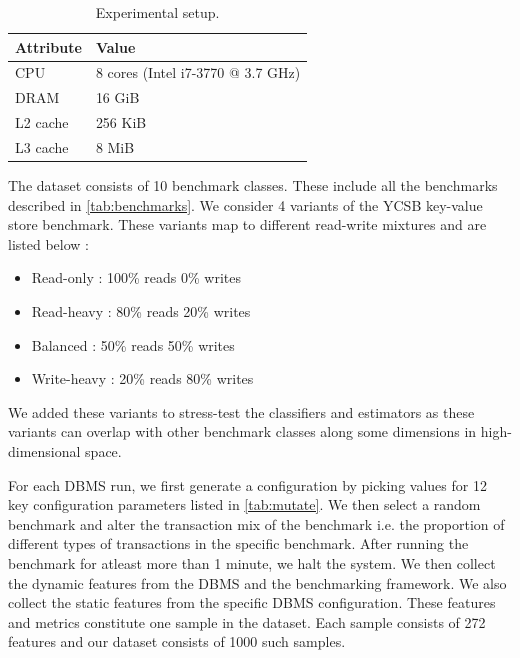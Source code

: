 \begin{table}
\centering
\small{
  \centering
  \begin{tabular}{l|l} 
	\toprule
   		Attribute &  Value  \\    
    \midrule
		CPU   &   8 cores (Intel i7-3770 @ 3.7 GHz)  \\
		DRAM   &  16 GiB  \\
		L2 cache  &  256 KiB  \\
		L3 cache  &  8 MiB  \\		
   \bottomrule
   \end{tabular}
 }
\caption{Experimental setup.}
\label{tab:setup}
\end{table}

The dataset consists of 10 benchmark classes. These include all the benchmarks
described in \cref{tab:benchmarks}. We consider 4 variants of the YCSB key-value
store benchmark. These variants map to different read-write mixtures and are
listed below :

\begin{itemize}
  \item {Read-only : 100\% reads 0\% writes } 
  \item {Read-heavy : 80\% reads 20\% writes } 
  \item {Balanced : 50\% reads 50\% writes } 
  \item {Write-heavy : 20\% reads 80\% writes } 
\end{itemize}

We added these variants to stress-test the classifiers and estimators as these
variants can overlap with other benchmark classes along some dimensions in
high-dimensional space. 

For each DBMS run, we first generate a configuration by picking
values for 12 key configuration parameters listed in \cref{tab:mutate}.
We then select a random benchmark and alter the transaction mix of the
benchmark i.e. the proportion of different types of transactions in 
the specific benchmark. After running the benchmark for atleast more than
1 minute, we halt the system.  We then collect the dynamic features from the
DBMS and the benchmarking framework. We also collect the static features
from the specific DBMS configuration. These features and metrics constitute
one sample in the dataset.
Each sample consists of 272 features and our dataset consists of 1000
such samples.

